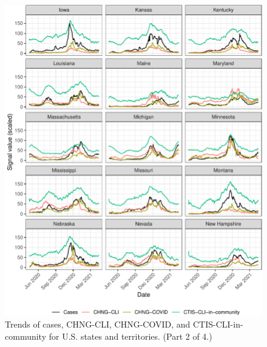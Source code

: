 \documentclass[9pt,twoside,lineno]{pnas-new}
\begin{document}
\begin{figure}

{\centering \includegraphics[width=\textwidth]{fig/state-trend-grids-2-1} 

}

\caption{Trends of cases, CHNG-CLI, CHNG-COVID, and CTIS-CLI-in-community for U.S. states and territories. (Part 2 of 4.)}\label{fig:state-trend-grids-2}
\end{figure}

\clearpage
\end{document}
